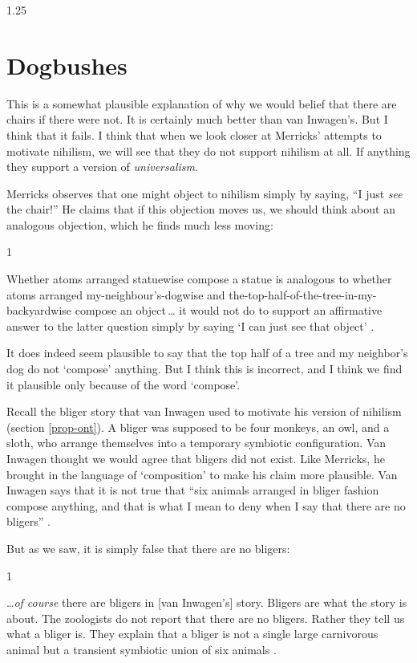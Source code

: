 \documentclass[11pt]{article}
\newenvironment{squote}{%
\begin{spacing}{1}
       	\begin{list}{}{%
\setlength{\labelwidth}{0pt}%
\rightmargin\leftmargin%
}
\item\relax
}{%
\end{list}%
\end{spacing}
}
\begin{document}
\begin{spacing}{1.25}
\section{Dogbushes}
\label{dogbush}
This is a somewhat plausible explanation of why we would belief that
there are chairs if there were not.  It is certainly much better than
van Inwagen's.  But I think that it fails.  I think that when we look
closer at Merricks' attempts to motivate nihilism, we will see that
they do not support nihilism at all.  If anything they support a
version of {\em universalism}.

Merricks observes that one might object to nihilism simply by saying,
``I just {\em see} the chair!''  He claims that if this objection
moves us, we should think about an analogous objection, which he finds
much less moving:

\begin{squote}
Whether atoms arranged statuewise compose a statue is analogous to
whether atoms arranged my-neighbour's-dogwise and
the-top-half-of-the-tree-in-my-backyardwise compose an object\,\ldots
it would not do to support an affirmative answer to the latter
question simply by saying `I can just see that object'
\citeyearpar[73]{merricks2001a}.
\end{squote}

It does indeed seem plausible to say that the top half of a tree and
my neighbor's dog do not `compose' anything.  But I think this is
incorrect, and I think we find it plausible only because of the word
`compose'.

Recall the bliger story that van Inwagen used to motivate his version
of nihilism (section \ref{prop-ont}).  A bliger was supposed to be
four monkeys, an owl, and a sloth, who arrange themselves into a
temporary symbiotic configuration.  Van Inwagen thought we would agree
that bligers did not exist.  Like Merricks, he brought in the language
of `composition' to make his claim more plausible.  Van Inwagen says
that it is not true that ``six animals arranged in bliger fashion
compose anything, and that is what I mean to deny when I say that
there are no bligers'' \citeyearpar[104]{inwagen1995}.

But as we saw, it is simply false that there are no bligers:

\begin{squote}
\ldots {\em of course} there are bligers in [van Inwagen's] story.
Bligers are what the story is about.  The zoologists do not report
that there are no bligers.  Rather they tell us what a bliger is.
They explain that a bliger is not a single large carnivorous animal
but a transient symbiotic union of six animals
\citep[704]{rosenberg1993}.
\end{squote}


\end{spacing}
\end{document}
